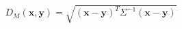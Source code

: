 \documentclass[preview]{standalone}
\begin{document}
\begin{align*}
D_M(\mathbf{x}, \mathbf{y}) = \sqrt{(\mathbf{x} - \mathbf{y})^T \Sigma^{-1} (\mathbf{x} - \mathbf{y})}
\end{align*}
\end{document}
